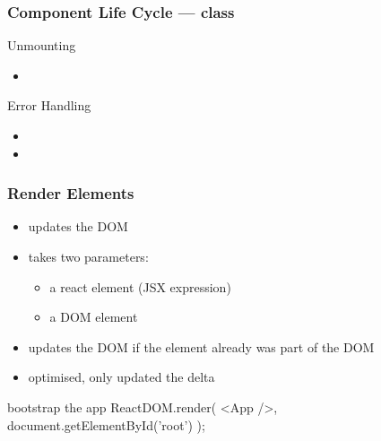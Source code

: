 \begin{frame}[fragile] \frametitle{Component Life Cycle --- class}
Unmounting
\begin{itemize}
  \item {}
\end{itemize}

Error Handling
\begin{itemize}
  \item {}
  \item {}
\end{itemize}

\end{frame}

\begin{frame}[fragile] \frametitle{Render Elements}
\begin{itemize}
  \item updates the DOM
  \item takes two parameters:
  \begin{itemize}
    \item a react element (JSX expression)
    \item a DOM element
  \end{itemize}
  \item updates the DOM if the element already was part of the DOM
  \item optimised, only updated the delta
\end{itemize}
\begin{CodeBox}{bootstrap the app}
ReactDOM.render(
   <App />,
  document.getElementById('root')
);
\end{CodeBox}
\end{frame}

